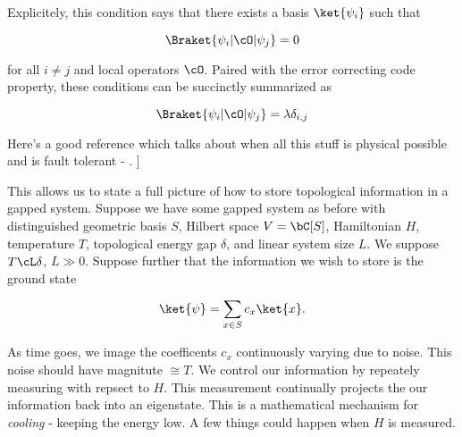 Explicitely, this condition says that there exists a basis $\ket{\psi_i}$ such that

$$ \Braket{\psi_i | \cO | \psi_j}=0$$

for all $i\neq j$ and local operators $\cO$. Paired with the error correcting code property, these conditions can be succinctly summarized as 

$$ \Braket{\psi_i | \cO | \psi_j}=\lambda \delta_{i,j}$$

Here's a good reference which talks about when all this stuff is physical possible and is fault tolerant - \cite{knapp2016quickly}.
]

This allows us to state a full picture of how to store topological information in a gapped system. Suppose we have some gapped system as before with distinguished geometric basis $S$, Hilbert space $V=\bC[S]$, Hamiltonian $H$, temperature $T$, topological energy gap $\delta$, and linear system size $L$. We suppose $T\cL \delta$, $L\gg 0$. Suppose further that the information we wish to store is the ground state

$$\ket{\psi}=\sum_{x\in S}c_x \ket{x}.$$

As time goes, we image the coefficents $c_x$ continuously varying due to noise. This noise should have magnitute $\cong T$. We control our information by repeately measuring with repsect to $H$. This measurement continually projects the our information back into an eigenstate. This is a mathematical mechanism for \textit{cooling} - keeping the energy low. A few things could happen when $H$ is measured.

